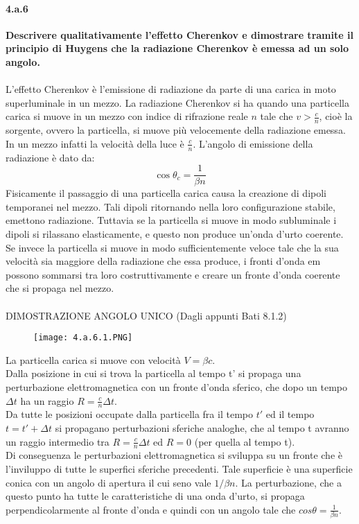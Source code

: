 \documentclass[twoside]{article}
\begin{document}
\paragraph{4.a.6}\textbf{Descrivere qualitativamente l’effetto Cherenkov e dimostrare tramite il principio di Huygens che la radiazione Cherenkov è emessa ad un solo angolo.}\\
\\
L'effetto Cherenkov è l'emissione di radiazione da parte di una carica in moto superluminale in un mezzo. La radiazione Cherenkov si ha quando una particella carica si muove in un mezzo con indice di rifrazione reale $n$ tale che $v>\frac{c}{n}$, cioè la sorgente, ovvero la particella, si muove più velocemente della radiazione emessa. In un mezzo infatti la velocità della luce è $\frac{c}{n}$. L'angolo di emissione della radiazione è dato da:
\begin{equation}
\cos\theta_c=\frac{1}{\beta n}
\end{equation}
Fisicamente il passaggio di una particella carica causa la creazione di dipoli temporanei nel mezzo. Tali dipoli ritornando nella loro configurazione stabile, emettono radiazione. Tuttavia se la particella si muove in modo subluminale i dipoli si rilassano elasticamente, e questo non produce un'onda d'urto coerente. Se invece la particella si muove in modo sufficientemente veloce tale che la sua velocità sia maggiore della radiazione che essa produce, i fronti d'onda em possono sommarsi tra loro costruttivamente e creare un fronte d'onda coerente che si propaga nel mezzo.\\
\\
DIMOSTRAZIONE ANGOLO UNICO (Dagli appunti Bati 8.1.2)\\
\begin{figure}[H]
    \centering
    \texttt{[image: 4.a.6.1.PNG]}
\end{figure}
La particella carica si muove con velocità $V=\beta c$.\\
Dalla posizione in cui si trova la particella al tempo t' si propaga una perturbazione elettromagnetica con un fronte d'onda sferico, che dopo un tempo $\Delta t$ ha un raggio $R=\frac{c}{n}\Delta t$.\\
Da tutte le posizioni occupate dalla particella fra il tempo $t'$ ed il tempo $t=t'+\Delta t$ si propagano perturbazioni sferiche analoghe, che al tempo t avranno un raggio intermedio tra $R=\frac{c}{n} \Delta t$ ed $R=0$ (per quella al tempo t).\\
Di conseguenza le perturbazioni elettromagnetica si sviluppa su un fronte che è l'inviluppo di tutte le superfici sferiche precedenti. Tale superficie è una superficie conica con un angolo di apertura il cui seno vale $1/\beta n$. La perturbazione, che a questo punto ha tutte le caratteristiche di una onda d'urto, si propaga perpendicolarmente al fronte d'onda e quindi con un angolo tale che $cos\theta=\frac{1}{\beta n}$.\\
\end{document}
